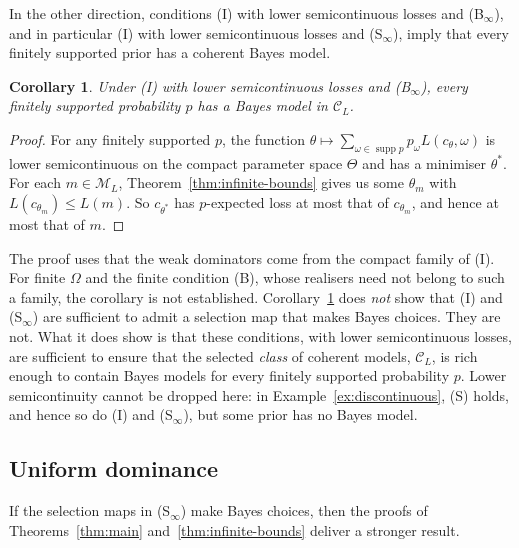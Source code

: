 \documentclass[11pt]{article}
\newtheorem{corollary}[theorem]{Corollary}
\theoremstyle{definition}
\theoremstyle{remark}
\newcommand{\M}{\mathcal M}
\newcommand{\C}{\mathcal C}
\newcommand{\supp}{\operatorname{supp}}
\begin{document}
In the other direction, conditions (I) with lower semicontinuous losses and (B$_\infty$), and in particular (I) with lower semicontinuous losses and (S$_\infty$), imply that every finitely supported prior has a coherent Bayes model.
\begin{corollary}\label{cor:bayes}
Under (I) with lower semicontinuous losses and (B$_\infty$), every finitely supported probability $p$ has a Bayes model in $\C_L$.
\end{corollary}
\begin{proof}
For any finitely supported $p$, the function $\theta\mapsto\sum_{\omega\in\supp p}p_\omega L(c_\theta,\omega)$ is lower semicontinuous on the compact parameter space $\Theta$ and has a minimiser $\theta^*$. For each $m\in\M_L$, Theorem~\ref{thm:infinite-bounds} gives us some $\theta_m$ with $L(c_{\theta_m})\le L(m)$. So $c_{\theta^*}$ has $p$-expected loss at most that of $c_{\theta_m}$, and hence at most that of $m$.
\end{proof}
The proof uses that the weak dominators come from the compact family of (I). For finite $\Omega$ and the finite condition (B), whose realisers need not belong to such a family, the corollary is not established. Corollary~\ref{cor:bayes} does \textit{not} show that (I) and (S$_\infty$) are sufficient to admit a selection map that makes Bayes choices. They are not. What it does show is that these conditions, with lower semicontinuous losses, are sufficient to ensure that the selected \textit{class} of coherent models, $\C_L$, is rich enough to contain Bayes models for every finitely supported probability $p$. Lower semicontinuity cannot be dropped here: in Example~\ref{ex:discontinuous}, (S) holds, and hence so do (I) and (S$_\infty$), but some prior has no Bayes model.





\subsection{Uniform dominance}


If the selection maps in (S$_\infty$) make Bayes choices, then the proofs of Theorems~\ref{thm:main} and~\ref{thm:infinite-bounds} deliver a stronger result.
\end{document}
